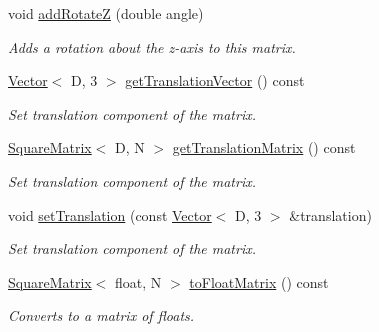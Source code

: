 \begin{Indent}
\begin{DoxyCompactItemize}
void \mbox{\hyperlink{classrev_1_1_square_matrix_a736616e6187a63102d6274bda61802ab}{add\+RotateZ}} (double angle)
\begin{DoxyCompactList}\small\item\em Adds a rotation about the z-\/axis to this matrix. \end{DoxyCompactList}\item 
\mbox{\label{classrev_1_1_square_matrix_a9fdc556142cd7adcc1328c9f1a762924}} 
\mbox{\hyperlink{classrev_1_1_vector}{Vector}}$<$ D, 3 $>$ \mbox{\hyperlink{classrev_1_1_square_matrix_a9fdc556142cd7adcc1328c9f1a762924}{get\+Translation\+Vector}} () const
\begin{DoxyCompactList}\small\item\em Set translation component of the matrix. \end{DoxyCompactList}\item 
\mbox{\label{classrev_1_1_square_matrix_aed4cac6c050c203bf74baa0c00db662c}} 
\mbox{\hyperlink{classrev_1_1_square_matrix}{Square\+Matrix}}$<$ D, N $>$ \mbox{\hyperlink{classrev_1_1_square_matrix_aed4cac6c050c203bf74baa0c00db662c}{get\+Translation\+Matrix}} () const
\begin{DoxyCompactList}\small\item\em Set translation component of the matrix. \end{DoxyCompactList}\item 
\mbox{\label{classrev_1_1_square_matrix_aacafa101f2bed2c13875f4898f6c1858}} 
void \mbox{\hyperlink{classrev_1_1_square_matrix_aacafa101f2bed2c13875f4898f6c1858}{set\+Translation}} (const \mbox{\hyperlink{classrev_1_1_vector}{Vector}}$<$ D, 3 $>$ \&translation)
\begin{DoxyCompactList}\small\item\em Set translation component of the matrix. \end{DoxyCompactList}\item 
\mbox{\label{classrev_1_1_square_matrix_a7e306f1bcd79977409c0d01c60b8548a}} 
\mbox{\hyperlink{classrev_1_1_square_matrix}{Square\+Matrix}}$<$ float, N $>$ \mbox{\hyperlink{classrev_1_1_square_matrix_a7e306f1bcd79977409c0d01c60b8548a}{to\+Float\+Matrix}} () const
\begin{DoxyCompactList}\small\item\em Converts to a matrix of floats. \end{DoxyCompactList}\item 

\end{DoxyCompactItemize}
\end{Indent}
